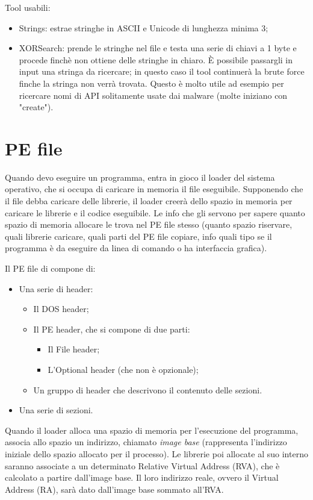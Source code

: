 \documentclass[a4paper]{book}
\begin{document}
Tool usabili:
\begin{itemize}
    \item Strings: estrae stringhe in ASCII e Unicode di lunghezza minima 3;
    \item XORSearch: prende le stringhe nel file e testa una serie di chiavi a 1 byte e procede finchè non ottiene delle stringhe in chiaro. È possibile passargli in input una stringa da ricercare; in questo caso il tool continuerà la brute force finche la stringa non verrà trovata. Questo è molto utile ad esempio per ricercare nomi di API solitamente usate dai malware (molte iniziano con "create").
\end{itemize}

\section{PE file}
Quando devo eseguire un programma, entra in gioco il loader del sistema operativo, che si occupa di caricare in memoria il file eseguibile. Supponendo che il file debba caricare delle librerie, il loader creerà dello spazio in memoria per caricare le librerie e il codice eseguibile. 
Le info che gli servono per sapere quanto spazio di memoria allocare le trova nel PE file stesso (quanto spazio riservare, quali librerie caricare, quali parti del PE file copiare, info quali tipo se il programma è da eseguire da linea di comando o ha interfaccia grafica). 

Il PE file di compone di:
\begin{itemize}
    \item Una serie di header:
        \begin{itemize}
        \item Il DOS header;
        \item Il PE header, che si compone di due parti:
        \begin{itemize}
            \item Il File header;
            \item L'Optional header (che non è opzionale);
        \end{itemize}
        \item Un gruppo di header che descrivono il contenuto delle sezioni.
    \end{itemize}
    \item Una serie di sezioni.
\end{itemize}

Quando il loader alloca una spazio di memoria per l'esecuzione del programma, associa allo spazio un indirizzo, chiamato \textit{image base} (rappresenta l'indirizzo iniziale dello spazio allocato per il processo). Le librerie poi allocate al suo interno saranno associate a un determinato Relative Virtual Address (RVA), che è calcolato a partire dall'image base. Il loro indirizzo reale, ovvero il Virtual Address (RA), sarà dato dall'image base sommato all'RVA.
\end{document}

